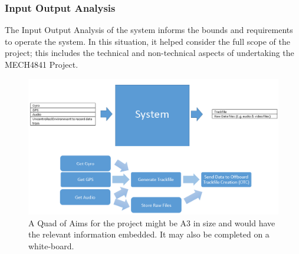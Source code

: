 \documentclass{UoNMCHA}
\numberwithin{equation}{section}
\begin{document}
\subsubsection{Input Output Analysis}
The Input Output Analysis of the system informs the bounds and requirements to operate the system. In this situation, it helped consider the full scope of the project; this includes the technical and non-technical aspects of undertaking the MECH4841 Project.
\begin{figure}[ht]
    \begin{center}
        \includegraphics[width=0.8\linewidth]{Figures/InputOutput.png}
        \caption{A Quad of Aims for the project might be A3 in size and would have the relevant information embedded. It may also be completed on a white-board.}
        \label{fig:AndroidDataExample}
    \end{center}
 \end{figure}
\end{document}
